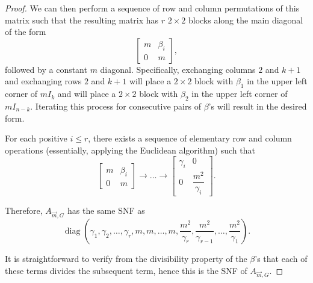 \documentclass[10pt,a4paper]{amsart}
\DeclareMathOperator{\diag}{diag}
\begin{document}
\begin{proof}
	We can then perform a sequence of row and column permutations of this matrix such that the resulting matrix has $r$ $2\times 2$ blocks along the main diagonal of the form
	\[
	\begin{bmatrix}
		m & \beta_i \\ 0 & m
	\end{bmatrix},
	\]
	followed by a constant $m$ diagonal. 
	Specifically, exchanging columns $2$ and $k+1$ and exchanging rows $2$ and $k+1$ will place a $2\times 2$ block with $\beta_1$ in the upper left corner of $mI_k$ and will place a $2\times 2$ block with $\beta_2$ in the upper left corner of $mI_{n-k}$.
	Iterating this process for consecutive pairs of $\beta$'s will result in the desired form. 	
	
	For each positive $i \leq r$, there exists a sequence of elementary row and column operations (essentially, applying the Euclidean algorithm) such that
	\[\begin{bmatrix}
		m & \beta_i \\ 0 & m
	\end{bmatrix} \to \dots \to  \begin{bmatrix}
		\gamma_i& 0 \\ 0 & \dfrac{m^2}{\gamma_i}
	\end{bmatrix}.\]
	
	Therefore, $A_{\vec{m}, G}$ has the same SNF as 
	\[\diag\left(\gamma_1, \gamma_2, \dots, \gamma_r, m, m, \dots, m, \dfrac{m^2}{\gamma_r}, \dfrac{m^2}{\gamma_{r-1}}, \dots, \dfrac{m^2}{\gamma_{1}}\right).\]
	
	It is straightforward to verify from the divisibility property of the $\beta$'s that each of these terms divides the subsequent term, hence this is the SNF of $A_{\vec{m}, G}$.	
\end{proof}
\end{document}
